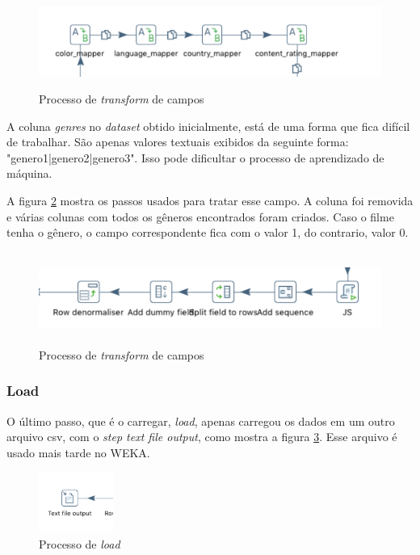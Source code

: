 \begin{figure}[H]
\centering
\includegraphics[height=3cm]{imagens/mappers.png}
\caption{Processo de \textit{transform} de campos}
\label{mappers}
\end{figure}

A coluna \textit{genres} no \textit{dataset} obtido inicialmente, está de uma forma que fica difícil de trabalhar. São apenas valores textuais exibidos da seguinte forma: "genero1|genero2|genero3". Isso pode dificultar o processo de aprendizado de máquina.

A figura \ref{genresDenormaliser} mostra os passos usados para tratar esse campo. A coluna foi removida e várias colunas com todos os gêneros encontrados foram criados. Caso o filme tenha o gênero, o campo correspondente fica com o valor 1, do contrario, valor 0.

\begin{figure}[H]
\centering
\includegraphics[height=3cm]{imagens/genres_step.png}
\caption{Processo de \textit{transform} de campos}
\label{genresDenormaliser}
\end{figure}

\subsubsection{Load}
O último passo, que é o carregar, \textit{load}, apenas carregou os dados em um outro arquivo csv, com o \textit{step text file output}, como mostra a figura \ref{lastStep}. Esse arquivo é usado mais tarde no WEKA.

\begin{figure}[H]
\centering
\includegraphics[height=2cm]{imagens/last_step.png}
\caption{Processo de \textit{load}}
\label{lastStep}
\end{figure}


